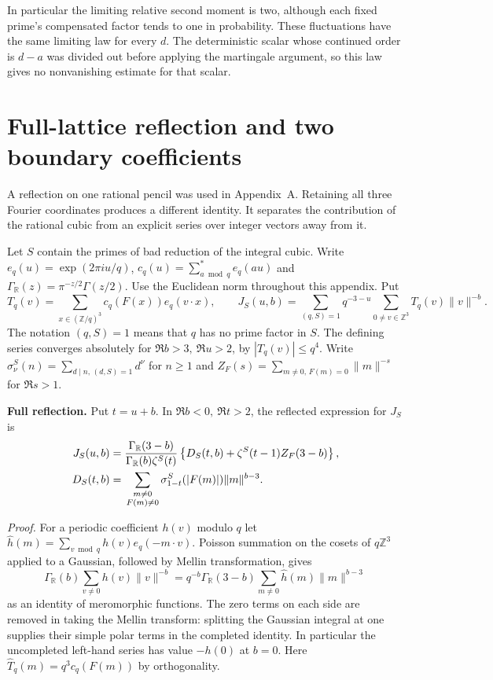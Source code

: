 \documentclass[11pt]{article}
\begin{document}
In particular the limiting relative second moment is two, although
each fixed prime's compensated factor tends to one in probability.
These fluctuations have the same limiting law for every $d$. The
deterministic scalar whose continued order is $d-a$ was divided out
before applying the martingale argument, so this law gives no
nonvanishing estimate for that scalar.

\section{Full-lattice reflection and two boundary coefficients}
\label{app:fullreflect}

A reflection on one rational pencil was used in Appendix~A.
Retaining all three Fourier coordinates produces a different identity.
It separates the contribution of the rational cubic from an explicit
series over integer vectors away from it.

Let $S$ contain the primes of bad reduction of the integral cubic.
Write $e_q(u)=\exp(2\pi i u/q)$,
$c_q(u)=\sum_{a\bmod q}^{*}e_q(au)$ and
$\Gamma_{\mathbb R}(z)=\pi^{-z/2}\Gamma(z/2)$. Use the Euclidean
norm throughout this appendix. Put
\[
 T_q(v)=\sum_{x\in(\mathbb Z/q)^3}c_q(F(x))e_q(v\cdot x),
 \qquad
 J_S(u,b)=\sum_{(q,S)=1}q^{-3-u}
               \sum_{0\ne v\in\mathbb Z^3}T_q(v)\|v\|^{-b}.
\]
The notation $(q,S)=1$ means that $q$ has no prime factor in $S$.
The defining series converges absolutely for $\Re b>3,\ \Re u>2$,
by $|T_q(v)|\le q^4$. Write
$\sigma_\nu^S(n)=\sum_{d\mid n,\,(d,S)=1}d^\nu$ for $n\ge1$
and $Z_F(s)=\sum_{m\ne0,\,F(m)=0}\|m\|^{-s}$ for $\Re s>1$.

\medskip
\noindent\textbf{Full reflection.}
Put $t=u+b$. In $\Re b<0,\ \Re t>2$, the reflected expression for
$J_S$ is
\begin{align}
J_S(u,b)={}&
\frac{\Gamma_{\mathbb R}(3-b)}
     {\Gamma_{\mathbb R}(b)\zeta^S(t)}
\left\{D_S(t,b)+\zeta^S(t-1)Z_F(3-b)\right\},\label{eq:fulldelta}\\
D_S(t,b)={}&
 \sum_{\substack{m\ne0\\F(m)\ne0}}
   \sigma_{1-t}^S(|F(m)|)\|m\|^{b-3}.\notag
\end{align}

\noindent\emph{Proof.}
For a periodic coefficient $h(v)$ modulo $q$ let
$\widehat h(m)=\sum_{v\bmod q} h(v)e_q(-m\cdot v)$.
Poisson summation on the cosets of $q\mathbb Z^3$ applied to a Gaussian,
followed by Mellin transformation, gives
\[
 \Gamma_{\mathbb R}(b)\sum_{v\ne0}h(v)\|v\|^{-b}
 =
 q^{-b}\Gamma_{\mathbb R}(3-b)
       \sum_{m\ne0}\widehat h(m)\|m\|^{b-3}
\]
as an identity of meromorphic functions. The zero terms on each side
are removed in taking the Mellin transform: splitting the Gaussian
integral at one supplies their simple polar terms in the completed
identity. In particular the uncompleted left-hand series has value
$-h(0)$ at $b=0$. Here $\widehat T_q(m)=q^3 c_q(F(m))$ by orthogonality.
\end{document}
